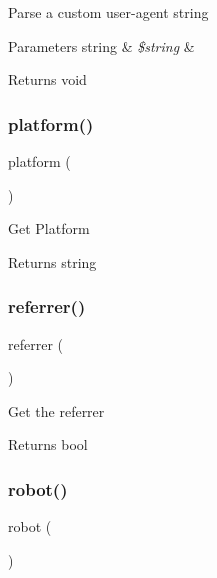 Parse a custom user-\/agent string


\begin{DoxyParams}[1]{Parameters}
string & {\em \$string} & \\
\hline
\end{DoxyParams}
\begin{DoxyReturn}{Returns}
void 
\end{DoxyReturn}
\mbox{\label{class_c_i___user__agent_ad69bddb2ba31b27415484b3da4213ba8}} 
\subsubsection{\texorpdfstring{platform()}{platform()}}
{\footnotesize\ttfamily platform (\begin{DoxyParamCaption}{ }\end{DoxyParamCaption})}

Get Platform

\begin{DoxyReturn}{Returns}
string 
\end{DoxyReturn}
\mbox{\label{class_c_i___user__agent_a3a7bdecfe4516d7ce790734ae1449d29}} 
\subsubsection{\texorpdfstring{referrer()}{referrer()}}
{\footnotesize\ttfamily referrer (\begin{DoxyParamCaption}{ }\end{DoxyParamCaption})}

Get the referrer

\begin{DoxyReturn}{Returns}
bool 
\end{DoxyReturn}
\mbox{\label{class_c_i___user__agent_a4d6a9230d82ec6fc2fdd6bc57f4da5e5}} 
\subsubsection{\texorpdfstring{robot()}{robot()}}
{\footnotesize\ttfamily robot (\begin{DoxyParamCaption}{ }\end{DoxyParamCaption})}

